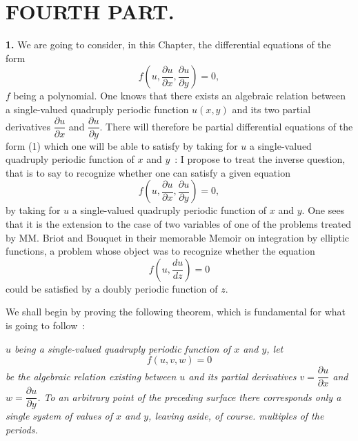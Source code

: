 \documentclass{article}
\begin{document}

\section*{FOURTH PART.}

\textbf{1.} We are going to consider, in this Chapter, the differential equations of the form
\[
f\left( u, \frac{\partial u}{\partial x}, \frac{\partial u}{\partial y} \right) = 0, \tag{1}
\]
$f$ being a polynomial. One knows that there exists an algebraic relation between a single-valued quadruply periodic function $u(x, y)$ and its two partial derivatives $\dfrac{\partial u}{\partial x}$ and $\dfrac{\partial u}{\partial y}$. There will therefore be partial differential equations of the form (1) which one will be able to satisfy by taking for $u$ a single-valued quadruply periodic function of $x$ and $y$~: I propose to treat the inverse question, that is to say to recognize whether one can satisfy a given equation
\[
f\left( u, \frac{\partial u}{\partial x}, \frac{\partial u}{\partial y} \right) = 0,
\]
by taking for $u$ a single-valued quadruply periodic function of $x$ and $y$. One sees that it is the extension to the case of two variables of one of the problems treated by MM. Briot and Bouquet in their memorable Memoir on integration by elliptic functions, a problem whose object was to recognize whether the equation
\[
f\left( u, \frac{du}{dz} \right) = 0
\]
could be satisfied by a doubly periodic function of $z$.

We shall begin by proving the following theorem, which is fundamental for what is going to follow~:

\emph{$u$ being a single-valued quadruply periodic function of $x$ and $y$, let}
\[
f(u, v, w) = 0
\]
\emph{be the algebraic relation existing between $u$ and its partial derivatives $v = \dfrac{\partial u}{\partial x}$ and $w = \dfrac{\partial u}{\partial y}$. To an arbitrary point of the preceding surface there corresponds only a single system of values of $x$ and $y$, leaving aside, of course. multiples of the periods.}
\end{document}
